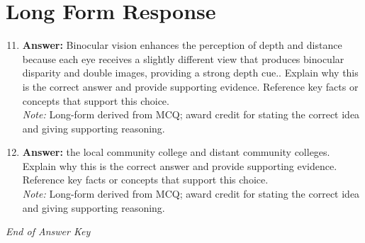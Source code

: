 \documentclass[12pt]{article}
\begin{document}
\section*{Long Form Response}
\begin{enumerate}[label=\arabic*.]
\setcounter{enumi}{10}
\item \textbf{Answer:} Binocular vision enhances the perception of depth and distance because each eye receives a slightly different view that produces binocular disparity and double images, providing a strong depth cue.. Explain why this is the correct answer and provide supporting evidence. Reference key facts or concepts that support this choice.
\\ \textit{Note:} Long-form derived from MCQ; award credit for stating the correct idea and giving supporting reasoning.
\item \textbf{Answer:} the local community college and distant community colleges. Explain why this is the correct answer and provide supporting evidence. Reference key facts or concepts that support this choice.
\\ \textit{Note:} Long-form derived from MCQ; award credit for stating the correct idea and giving supporting reasoning.
\end{enumerate}

\vfill
\noindent\textit{End of Answer Key}
\end{document}
